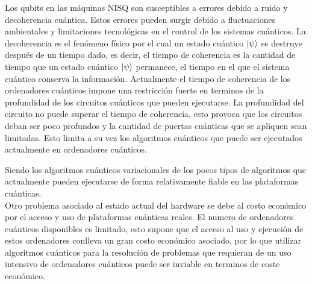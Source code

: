 Los qubits en las máquinas NISQ son susceptibles a errores debido a ruido y decoherencia cuántica. Estos errores pueden surgir debido a fluctuaciones ambientales y limitaciones tecnológicas en el control de los sistemas cuánticos. La decoherencia es el fenómeno físico por el cual un estado cuántico $\ket{\psi}$ se destruye después de un tiempo dado, es decir, el tiempo de coherencia es la cantidad de tiempo que un estado cuántico $\ket{\psi}$ permanece, el tiempo en el que el sistema cuántico conserva la información. Actualmente el tiempo de coherencia de los ordenadores cuánticos impone una restricción fuerte en terminos de la profundidad de los circuitos cuánticos que pueden ejecutarse. La profundidad del circuito no puede superar el tiempo de coherencia, esto provoca que los circuitos deban ser poco profundos y la cantidad de puertas cuánticas que se apliquen sean limitadas. Esto limita a su vez los algoritmos cuánticos que puede ser ejecutados actualmente en ordenadores cuánticos. 

\newpage

Siendo los algoritmos cuánticos variacionales de los pocos tipos de algoritmos que actualmente pueden ejecutarse de forma relativamente fiable en las plataformas cuánticas. \\

Otro problema asociado al estado actual del hardware se debe al costo económico por el acceso y uso de plataformas cuánticas reales. El numero de ordenadores cuánticos disponibles es limitado, esto supone que el acceso al uso y ejecución de estos ordenadores conlleva un gran costo económico asociado, por lo que utilizar algoritmos cuánticos para la resolución de problemas que requieran de un uso intensivo de ordenadores cuánticos puede ser inviable en terminos de coste económico. 





